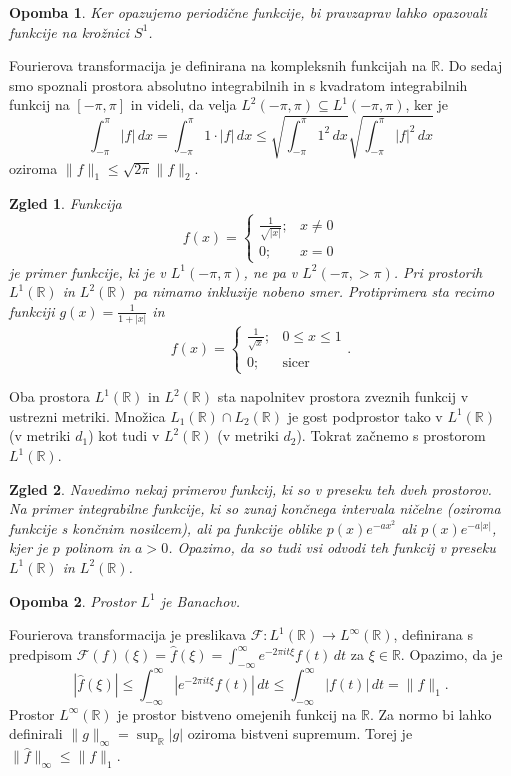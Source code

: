 \documentclass[10pt, a4paper]{article}
\newtheorem*{opomba}{Opomba}
\newtheorem{zgled}{Zgled}[section]
\newcommand{\R}{\mathbb {R}}
\newcommand{\F}{\mathcal{F}}
\begin{document}
\begin{opomba}
    Ker opazujemo periodične funkcije, bi pravzaprav lahko opazovali funkcije na krožnici $S^1$.
\end{opomba}

Fourierova transformacija je definirana na kompleksnih funkcijah na $\R$.
Do sedaj smo spoznali prostora absolutno integrabilnih in s kvadratom integrabilnih funkcij na $[-\pi, \pi]$ 
in videli, da velja $L^2 (-\pi, \pi) \subseteq L^1 (-\pi, \pi)$,
ker je $$\int_{-\pi} ^\pi |f|\, dx = \int_{-\pi} ^\pi 1 \cdot |f|\, dx \leq \sqrt{\int_{-\pi} ^\pi 1^2\, dx} \sqrt{\int_{-\pi} ^\pi |f|^2\, dx}$$
oziroma $\|f\|_1 \leq \sqrt{2\pi} \|f\|_2$.

\begin{zgled}
    Funkcija $$f(x) = \begin{cases}
        \frac{1}{\sqrt{|x|}}; & x \neq 0\\
        0; & x = 0
    \end{cases}$$
    je primer funkcije, ki je v $L^1 (-\pi, \pi)$,
    ne pa v $L^2 (-\pi, >\pi)$.
    Pri prostorih $L^1 (\R)$ in $L^2 (\R)$ pa nimamo inkluzije  nobeno smer.
    Protiprimera sta recimo funkciji $g(x) = \frac{1}{1 + |x|}$ in
    $$f(x) = \begin{cases}
        \frac{1}{\sqrt{x}}; & 0 \leq x \leq 1\\
        0; & \mathrm{sicer}
    \end{cases}.$$ 
\end{zgled}

Oba prostora $L^1 (\R)$ in $L^2 (\R)$ sta napolnitev prostora zveznih funkcij v ustrezni metriki.
Množica $L_1 (\R) \cap L_2 (\R)$ je gost podprostor tako v $L^1 (\R)$ (v metriki $d_1$) kot tudi v $L^2 (\R)$ (v metriki $d_2$).
Tokrat začnemo s prostorom $L^1 (\R)$.

\begin{zgled}
    Navedimo nekaj primerov funkcij, ki so v preseku teh dveh prostorov.
    Na primer integrabilne funkcije, ki so zunaj končnega intervala ničelne (oziroma funkcije s končnim nosilcem),
    ali pa funkcije oblike $p(x) e^{-ax^2}$ ali $p(x) e^{-a|x|}$, kjer je $p$ polinom in $a > 0$.
    Opazimo, da so tudi vsi odvodi teh funkcij v preseku $L^1 (\R)$ in $L^2 (\R)$.
\end{zgled}

\begin{opomba}
    Prostor $L^1$ je Banachov.
\end{opomba}

Fourierova transformacija je preslikava $\F: L^1 (\R) \to L^\infty (\R)$,
definirana s predpisom $\F(f) (\xi) = \hat{f} (\xi) = \int_{-\infty} ^\infty e^{-2\pi i t \xi} f(t)\, dt$
za $\xi \in \R$. Opazimo, da je
$$
    |\hat{f}(\xi)| \leq \int_{-\infty} ^\infty |e^{-2\pi i t \xi} f(t)|\, dt \leq \int_{-\infty} ^\infty |f(t)|\, dt = \|f\|_1.
$$
Prostor $L^\infty (\R)$ je prostor bistveno omejenih funkcij na $\R$.
Za normo bi lahko definirali $\|g\|_\infty = \sup_\R |g|$ oziroma bistveni supremum.
Torej je $\| \hat{f} \|_\infty \leq \|f\|_1$.
\end{document}
